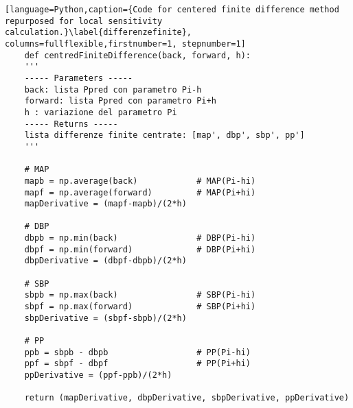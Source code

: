 \begin{lstlisting}[language=Python,caption={Code for centered finite difference method repurposed for local sensitivity calculation.}\label{differenzefinite}, columns=fullflexible,firstnumber=1, stepnumber=1]
    def centredFiniteDifference(back, forward, h):
    '''
    ----- Parameters -----
    back: lista Ppred con parametro Pi-h
    forward: lista Ppred con parametro Pi+h
    h : variazione del parametro Pi
    ----- Returns -----
    lista differenze finite centrate: [map', dbp', sbp', pp']        
    '''
    
    # MAP
    mapb = np.average(back)            # MAP(Pi-hi)
    mapf = np.average(forward)         # MAP(Pi+hi)
    mapDerivative = (mapf-mapb)/(2*h)
    
    # DBP
    dbpb = np.min(back)                # DBP(Pi-hi)
    dbpf = np.min(forward)             # DBP(Pi+hi)
    dbpDerivative = (dbpf-dbpb)/(2*h)
    
    # SBP
    sbpb = np.max(back)                # SBP(Pi-hi)
    sbpf = np.max(forward)             # SBP(Pi+hi)
    sbpDerivative = (sbpf-sbpb)/(2*h)
    
    # PP
    ppb = sbpb - dbpb                  # PP(Pi-hi)
    ppf = sbpf - dbpf                  # PP(Pi+hi)
    ppDerivative = (ppf-ppb)/(2*h)
    
    return (mapDerivative, dbpDerivative, sbpDerivative, ppDerivative)
\end{lstlisting}